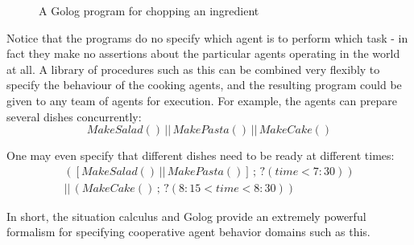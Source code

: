 %
\begin{figure}
\begin{centering}
\par\end{centering}

\caption{A Golog program for chopping an ingredient\label{fig:MIndiGolog:ChopTypeInto}}

\end{figure}


Notice that the programs do no specify which agent is to perform which
task - in fact they make no assertions about the particular agents
operating in the world at all. A library of procedures such as this
can be combined very flexibly to specify the behaviour of the cooking
agents, and the resulting program could be given to any team of agents
for execution. For example, the agents can prepare several dishes
concurrently:\[
MakeSalad()\,||\, MakePasta()\,||\, MakeCake()\]


One may even specify that different dishes need to be ready at different
times:\begin{multline*}
\left(\left[MakeSalad()\,||\, MakePasta()\right]\,;\,?(time<7:30)\right)\\
||\,\left(MakeCake()\,;\,?(8:15<time<8:30)\right)\end{multline*}


In short, the situation calculus and Golog provide an extremely powerful
formalism for specifying cooperative agent behavior domains such as
this.

